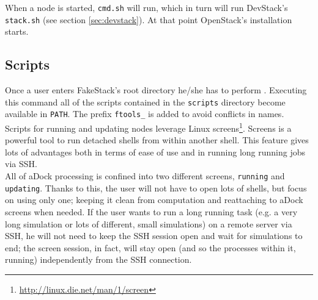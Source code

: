 When a node is started, \texttt{cmd.sh} will run, which in turn will run DevStack's \texttt{stack.sh} (see section \ref{sec:devstack}). At that point OpenStack's installation starts.

\subsection{Scripts}
\label{sub:fakestack_scripts}
Once a user enters FakeStack's root directory he/she has to perform . Executing this command all of the scripts contained in the \texttt{scripts} directory become available in \texttt{PATH}. The prefix \texttt{ftools\_} is added to avoid conflicts in names.\\
Scripts for running and updating nodes leverage Linux screens\footnote{\url{http://linux.die.net/man/1/screen}}. Screens is a powerful tool to run detached shells from within another shell. This feature gives lots of advantages both in terms of ease of use and in running long running jobs via SSH.\\
All of aDock processing is confined into two different screens, \texttt{running} and \texttt{updating}. Thanks to this, the user will not have to open lots of shells, but focus on using only one; keeping it clean from computation and reattaching to aDock screens when needed. If the user wants to run a long running task (e.g. a very long simulation or lots of different, small simulations) on a remote server via SSH, he will not need to keep the SSH session open and wait for simulations to end; the screen session, in fact, will stay open (and so the processes within it, running) independently from the SSH connection. 

